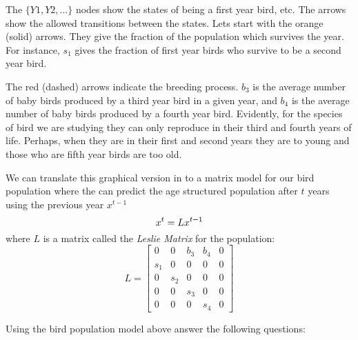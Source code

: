 \documentclass[11pt, a4paper]{article}
\begin{document}
\begin{enumerate}
The $\{Y1,Y2, ...\}$ nodes show the states of being a first year bird, etc. The arrows show the allowed transitions between the states. Lets start with the orange (solid) arrows. They give the fraction of the population which survives the year. For instance, $s_{1}$ gives the fraction of first year birds who survive to be a second year bird. 

The red (dashed) arrows indicate the breeding process. $b_3$ is the average number of baby birds produced by a third year bird in a given year, and $b_4$ is the average number of baby birds produced by a fourth year bird. Evidently, for the species of bird we are studying they can only reproduce in their third and fourth years of life. Perhaps, when they are in their first and second years they are to young and those who are fifth year birds are too old. 

We can translate this graphical version in to a matrix model for our bird population where the can predict the age structured population after $t$ years using the previous year $x^{t-1}$
\begin{equation}
x^{t}=Lx^{t-1} \\
\end{equation}
where $L$ is a matrix called the \textit{Leslie Matrix} for the population:
\begin{equation}
L=
\begin{bmatrix}
0 & 0 & b_3 & b_4 & 0 \\
s_1 & 0 &0 &0 &0 \\
0 & s_2 &0 &0 &0 \\
0 &0 & s_3 &0 & 0 \\
0 &0 & 0 & s_4 & 0 
\end{bmatrix}
\end{equation}

Using the bird population model above answer the following questions:


\end{enumerate}
\end{document}
